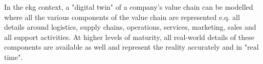 %
%
In the \gls{ekg} context, a "digital twin" of a company's value chain can be modelled
where all the various components of the value chain are represented e.q. all details around logistics,
supply chains, operations, services, marketing, sales and all support activities.
At higher levels of maturity, all real-world details of these components are available as well and represent
the reality accurately and in "real time".
